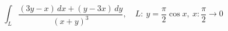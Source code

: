 \documentclass{ctexart}
\begin{document}
\[
\int_L \frac{(3y-x)\,dx + (y-3x)\,dy}{(x+y)^3},
\quad L:\ y=\frac{\pi}{2}\cos x,\ x:\frac{\pi}{2}\to 0
\]
\end{document}
